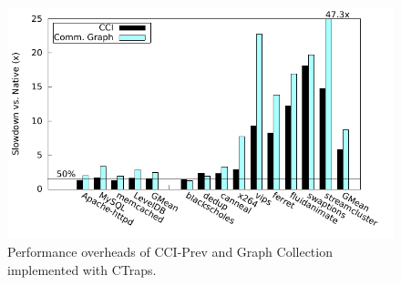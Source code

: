 \documentclass[10pt,nocopyrightspace]{sigplanconf}
\newcommand{\ctraps}{CTraps\xspace}
\newcommand{\Caption}[1]{\begin{minipage}{.95\columnwidth} \caption{#1} \end{minipage} \vspace{-1.2ex}}
\begin{document}
\begin{figure}
\centering
\includegraphics[width=.9\columnwidth]{plots/appperf.pdf}
\Caption{\label{fig:perfapps}Performance overheads of CCI-Prev and Graph Collection implemented with \ctraps.}
\end{figure}
\end{document}
